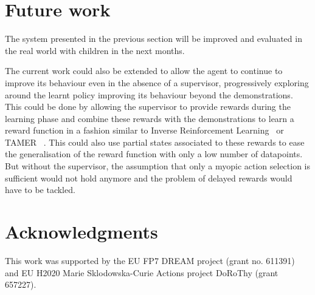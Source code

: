 \documentclass[letterpaper]{article} %
\begin{document}
\section{Future work}

The system presented in the previous section will be improved and
evaluated in the real world with children in the next months.

The current work could also be extended to allow the agent to continue to
improve its behaviour even in the absence of a supervisor, progressively
exploring around the learnt policy improving its behaviour beyond the
demonstrations. This could be done by allowing the supervisor to provide rewards
during the learning phase and combine these rewards with the demonstrations to
learn a reward function in a fashion similar to Inverse Reinforcement
Learning~\cite{abbeel2004apprenticeship} or TAMER ~\cite{knox2009interactively}.
This could also use partial states associated to these rewards to ease the
generalisation of the reward function with only a low number of datapoints.  But
without the supervisor, the assumption that only a myopic action selection is
sufficient would not hold anymore and the problem of delayed rewards would have
to be tackled.

\section{Acknowledgments} This work was supported by the EU FP7 DREAM project
(grant no.  611391) and EU H2020 Marie Sklodowska-Curie Actions project DoRoThy
(grant 657227).  

 
\end{document}
